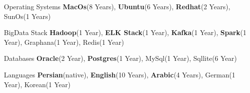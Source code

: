 \begin{cvskills}
  \cvskill
    {Operating Systems} %
    {\textbf{MacOs}(8 Years), \textbf{Ubuntu}(6 Years), \textbf{Redhat}(2 Years), SunOs(1 Years)} %
    
  \cvskill
    {BigData Stack} %
    {\textbf{Hadoop}(1 Year), \textbf{ELK Stack}(1 Year), \textbf{Kafka}(1 Year), \textbf{Spark}(1 Year), Graphana(1 Year), Redis(1 Year)} %


  \cvskill
    {Databases} %
    {\textbf{Oracle}(2 Year), \textbf{Postgres}(1 Year), MySql(1 Year), Sqllite(6 Year)} %

  \cvskill
    {Languages} %
    {\textbf{Persian}(native), \textbf{English}(10 Years),  \textbf{Arabic}(4 Years), German(1 Year), Korean(1 Year)} %
\end{cvskills}
